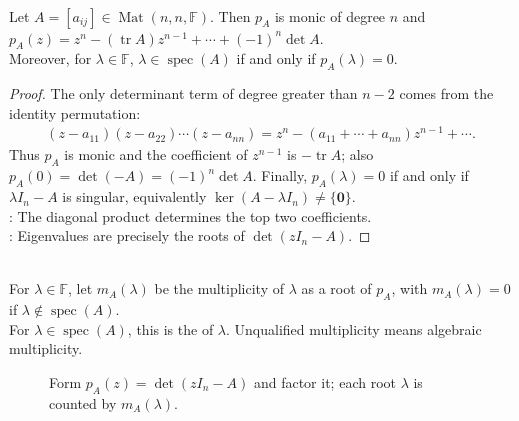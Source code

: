 \begin{theorem} \label{thm:matrix-characteristic-polynomial-basic-coefficients} \\
Let $A=[a_{ij}]\in\operatorname{Mat}(n,n,\mathbb{F})$. Then $p_A$ is monic of degree $n$ and $p_A(z)=z^n-(\operatorname{tr}A)z^{n-1}+\cdots+(-1)^n\det A$.\\
Moreover, for $\lambda\in\mathbb{F}$, $\lambda\in\operatorname{spec}(A)$ if and only if $p_A(\lambda)=0$.
\begin{proof}
The only determinant term of degree greater than $n-2$ comes from the identity permutation:
\begin{align}
(z-a_{11})(z-a_{22})\cdots(z-a_{nn})=z^n-(a_{11}+\cdots+a_{nn})z^{n-1}+\cdots.
\nonumber
\end{align}
Thus $p_A$ is monic and the coefficient of $z^{n-1}$ is $-\operatorname{tr}A$; also $p_A(0)=\det(-A)=(-1)^n\det A$. Finally, $p_A(\lambda)=0$ if and only if $\lambda I_n-A$ is singular, equivalently $\ker(A-\lambda I_n)\neq\{\mathbf{0}\}$.\\
: The diagonal product determines the top two coefficients.\\
: Eigenvalues are precisely the roots of $\det(zI_n-A)$.
\end{proof}
\end{theorem}

\begin{definition} \label{def:matrix-algebraic-multiplicity} \\
For $\lambda\in\mathbb{F}$, let $m_A(\lambda)$ be the multiplicity of $\lambda$ as a root of $p_A$, with $m_A(\lambda)=0$ if $\lambda\notin\operatorname{spec}(A)$.\\
For $\lambda\in\operatorname{spec}(A)$, this is the  of $\lambda$. Unqualified multiplicity means algebraic multiplicity.
\end{definition}

\begin{figure}[H]
  \centering
  
  \caption{Form $p_A(z)=\det(zI_n-A)$ and factor it; each root $\lambda$ is counted by $m_A(\lambda)$.}
  \label{fig:characteristic-polynomial-roots}
\end{figure}

